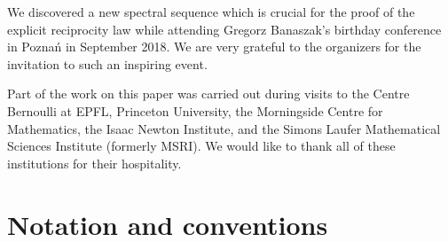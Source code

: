 \documentclass[cjm]{ipart}
\theoremstyle{plain}
\theoremstyle{remark}
\numberwithin{equation}{subsection}
\begin{document}
 We discovered a new spectral sequence which is crucial for the proof of the explicit reciprocity law while attending Gregorz Banaszak's birthday conference in Pozna\'n in September 2018. We are very grateful to the organizers for the invitation to such an inspiring event.

 Part of the work on this paper was carried out during visits to the Centre Bernoulli at EPFL, Princeton University, the Morningside Centre for Mathematics, the Isaac Newton Institute, and the Simons Laufer Mathematical Sciences Institute (formerly MSRI). We would like to thank all of these institutions for their hospitality.


\section{Notation and conventions}


\end{document}

